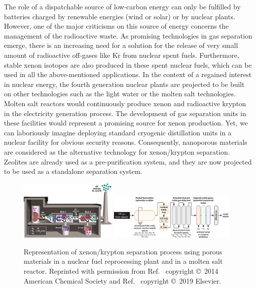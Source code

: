 \documentclass[main.tex]{subfiles}
\begin{document}
The role of a dispatchable source of low-carbon energy can only be fulfilled by batteries charged by renewable energies (wind or solar) or by nuclear plants. However, one of the major criticisms on this source of energy concerns the management of the radioactive waste. As promising technologies in gas separation emerge, there is an increasing need for a solution for the release of very small amount of radioactive off-gases like Kr from nuclear spent fuels.\autocite{Blomeke_1969} Furthermore, stable xenon isotopes are also produced in these spent nuclear fuels, which can be used in all the above-mentioned applications. In the context of a regained interest in nuclear energy, the fourth generation nuclear plants are projected to be built on other technologies such as the light water or the molten salt technologies.\autocite{LeBlanc_2010} Molten salt reactors would continuously produce xenon and radioactive krypton in the electricity generation process.\autocite{Riley_2019} The development of gas separation units in these facilities would represent a promising source for xenon production. Yet, we can laboriously imagine deploying standard cryogenic distillation units in a nuclear facility for obvious security reasons. Consequently, nanoporous materials are considered as the alternative technology for xenon/krypton separation. Zeolites are already used as a pre-purification system,\autocite{kerry2007industrial} and they are now projected to be used as a standalone separation system. 

\begin{figure}[ht]
  \includegraphics[width=0.42\textwidth]{figures/1-screening/Kr_treatment.jpg}
  \includegraphics[width=0.55\textwidth]{figures/1-screening/MSR_noble_gas.jpg}
  \caption{Representation of xenon/krypton separation process using porous materials in a nuclear fuel reprocessing plant and in a molten salt reactor. Reprinted with permission from Ref.~\cite{Banerjee_2014} copyright \copyright\ 2014 American Chemical Society and Ref.~\cite{Riley_2019} copyright \copyright\ 2019 Elsevier.}\label{fgr:industrial}
\end{figure}
\end{document}
